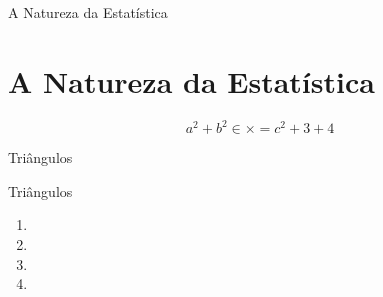 \documentclass[]{livroabertoem}
\begin{document}
\begin{teachersection}{A Natureza da Estatística}

\lipsum[1-7]

\end{teachersection}
\section{A Natureza da Estatística}

\lipsum[1-3]


\lipsum[1]
\[
    a^2 + b^2 \in \times = c^2 + 3 + 4
\]

\begin{task}{Triângulos}

\begin{teacher}
  \lipsum[12]
  \lipsum[13]
  \lipsum[13]
\end{teacher}

\lipsum[2]
\end{task}

\lipsum[3]


\begin{example}{Triângulos}
  \lipsum[4]
\end{example}

\newpage

\begin{research}
  \lipsum[6]
\end{research}

\begin{project}
  \lipsum[7]
\end{project}


\begin{knowledge}
\lipsum[5]
\end{knowledge}

\begin{reflection}
\lipsum[6]
\end{reflection}


\exercise

\begin{enumerate}
  \item \lipsum[7]
  \item \lipsum[8]
  \item \lipsum[9]
  \item \lipsum[10]
\end{enumerate}

\end{document}
